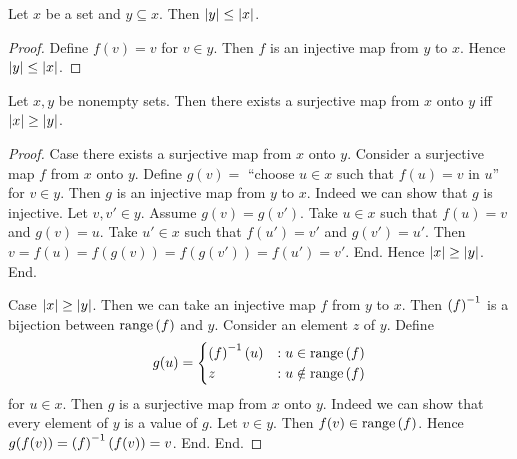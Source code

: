 \documentclass[../set-theory.tex]{subfiles}
\begin{document}
  \begin{forthel}
    \begin{corollary}
      Let $x$ be a set and $y \subseteq x$.
      Then $\left\vert y\right\vert \leq \left\vert x\right\vert$.
    \end{corollary}
    \begin{proof}
      Define $f(v) = v$ for $v \in y$.
      Then $f$ is an injective map from $y$ to $x$.
      Hence $\left\vert y\right\vert \leq \left\vert x\right\vert$.
    \end{proof}
  \end{forthel}

  \begin{forthel}
    \begin{proposition}
      Let $x, y$ be nonempty sets.
      Then there exists a surjective map from $x$ onto $y$ iff $\left\vert x\right\vert \geq \left\vert y\right\vert$.
    \end{proposition}
    \begin{proof}
      Case there exists a surjective map from $x$ onto $y$.
        Consider a surjective map $f$ from $x$ onto $y$.
        Define $g(v) =$ ``choose $u \in x$ such that $f(u) = v$ in $u$'' for
        $v \in y$.
        Then $g$ is an injective map from $y$ to $x$.
        Indeed we can show that $g$ is injective.
          Let $v, v' \in y$.
          Assume $g(v) = g(v')$.
          Take $u \in x$ such that $f(u) = v$ and $g(v) = u$.
          Take $u' \in x$ such that $f(u') = v'$ and $g(v') = u'$.
          Then $v
            = f(u)
            = f(g(v))
            = f(g(v'))
            = f(u')
            = v'$.
        End.
        Hence $\left\vert x\right\vert \geq \left\vert y\right\vert$.
      End.

      Case $\left\vert x\right\vert \geq \left\vert y\right\vert$.
        Then we can take an injective map $f$ from $y$ to $x$.
        Then $\left(f\right)^{-1}$ is a bijection between $\mathrm{range}\left(f\right)$ and $y$.
        Consider an element $z$ of $y$.
        Define \[ g(u) =
          \begin{cases}
            \left(f\right)^{-1}(u) & : u \in \mathrm{range}\left(f\right) \\
            z         & : u \notin \mathrm{range}\left(f\right)
          \end{cases} \]
        for $u \in x$.
        Then $g$ is a surjective map from $x$ onto $y$.
        Indeed we can show that every element of $y$ is a value of $g$.
          Let $v \in y$.
          Then $f(v) \in \mathrm{range}\left(f\right)$.
          Hence $g(f(v)) = \left(f\right)^{-1}(f(v)) = v$.
        End.
      End.
    \end{proof}
  \end{forthel}
\end{document}
